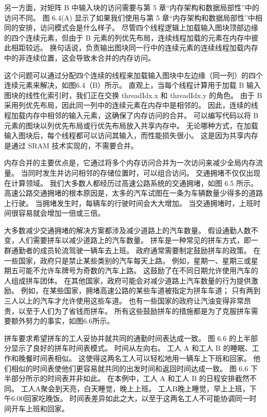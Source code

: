 另一方面，对矩阵 B 中输入块的访问需要与第 5 章“内存架构和数据局部性”中的访问不同。 图 6.4(A) 显示了如果我们使用与第 5 章“内存架构和数据局部性”中相同的安排，访问模式会是什么样子。 尽管四个线程逻辑上加载输入图块顶部边缘的四个连续元素，但由于 B 元素的列优先布局，连续线程加载的元素在内存中彼此相距较远。 换句话说，负责输出图块同一行中的连续元素的连续线程加载内存中的非连续位置，这会导致未合并的内存访问。

这个问题可以通过分配四个连续的线程来加载输入图块中左边缘（同一列）的四个连续元素来解决，如图6.4（B）所示。 直观上，当每个线程计算用于加载 B 输入图块的线性化索引时，我们正在交换 threadIdx.x 和 threadIdx.y 的角色。 由于 B 采用列优先布局，因此同一列中的连续元素在内存中是相邻的。 因此，连续的线程加载内存中相邻的输入元素，这确保了内存访问的合并。 可以编写代码以将 B 元素的图块以列优先布局或行优先布局放入共享内存中。 无论哪种方式，在加载输入图块后，每个线程都可以访问其输入，而性能损失很小。 这是因为共享内存是通过 SRAM 技术实现的，不需要合并。

内存合并的主要优点是，它通过将多个内存访问合并为一次访问来减少全局内存流量。 当同时发生并访问相邻的存储位置时，可以组合访问。 交通拥堵不仅仅出现在计算领域。 我们大多数人都经历过高速公路系统的交通拥堵，如图 6.5 所示。 高速公路交通拥堵的根本原因是，太多的汽车试图在一条为车辆数量少得多的道路上行驶。 当拥堵发生时，每辆车的行驶时间会大大增加。 当交通拥堵时，上班时间很容易就会增加一倍或三倍。

大多数减少交通拥堵的解决方案都涉及减少道路上的汽车数量。 假设通勤人数不变，人们需要拼车以减少道路上的汽车数量。 拼车是一种常见的拼车方式，即一群通勤者的成员轮流驾驶一辆车去上班。 政府通常需要制定鼓励拼车的政策。 在一些国家，政府只是禁止某些类别的汽车每天上路。 例如，星期一、星期三或星期五可能不允许车牌号为奇数的汽车上路。 这鼓励了在不同日期允许使用汽车的人组成拼车团体。 在其他国家，政府可能会对减少道路上汽车数量的行为提供激励。 例如，在某些国家，拥堵高速公路的某些车道被指定为拼车车道； 只有两到三人以上的汽车才允许使用这些车道。 也有一些国家的政府让汽油变得非常昂贵，以至于人们为了省钱而拼车。 所有这些鼓励拼车的措施都是为了克服拼车需要额外努力的事实，如图6.6所示。

拼车要求希望拼车的工人妥协并就共同的通勤时间表达成一致。 图 6.6 的上半部分显示了良好的拼车时间表模式。 时间从左向右。 工人 A 和工人 B 的睡眠、工作和晚餐时间表相似。 这使得这两名工人可以轻松地用一辆车上下班和回家。 他们相似的时间表使他们更容易就共同的出发时间和返回时间达成一致。 图 6.6 下半部分所示的时间表并非如此。 在本例中，工人 A 和工人 B 的日程安排截然不同。 工人A聚会到天亮，白天睡觉，晚上上班。 工人B晚上睡觉，早上上班，下午6:00回家吃晚饭。 时间表差异如此之大，以至于这两名工人不可能协调同一时间开车上班和回家。

